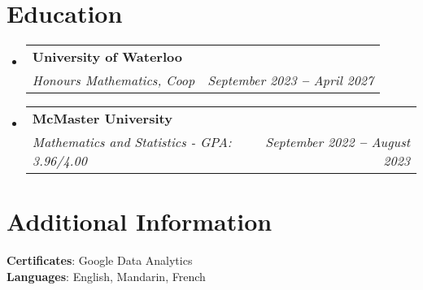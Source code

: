 \documentclass[letterpaper,11pt]{article}
\makeatletter
\newcommand{\resumeSubheading}[4]{
  \vspace{-2pt}\item
    \begin{tabular*}{0.97\textwidth}[t]{l@{\extracolsep{\fill}}r}
      \textbf{#1} & #2 \\
      \textit{\small#3} & \textit{\small #4} \\
    \end{tabular*}\vspace{-7pt}
}
\newcommand{\resumeSubHeadingListStart}{\begin{itemize}[leftmargin=0.15in, label={}]}
\newcommand{\resumeSubHeadingListEnd}{\end{itemize}}
\makeatother
\begin{document}
\section{Education}
  \resumeSubHeadingListStart
    \resumeSubheading
      {University of Waterloo}{}
      {Honours Mathematics, Coop}{September 2023 \textbf{--} April 2027}
    \resumeSubheading
      {McMaster University}{}
      {Mathematics and Statistics - GPA: 3.96/4.00}{September 2022 \textbf{--} August 2023}

  \resumeSubHeadingListEnd

\section{Additional Information}
 \begin{itemize}[leftmargin=0.15in, label={}]
    \small{\item{
     \textbf{Certificates}{: Google Data Analytics} \\
     \textbf{Languages}{: English, Mandarin, French} \\
    }}
 \end{itemize}
 
\end{document}
